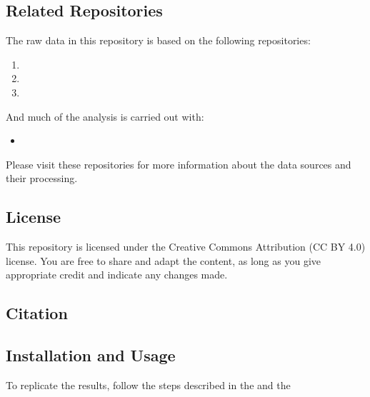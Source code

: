 \documentclass[letterpaper,10pt,english]{sphinxmanual}
\begin{document}
\subsection{Related Repositories}
\label{\detokenize{home:related-repositories}}
\sphinxAtStartPar
The raw data in this repository is based on the following repositories:
\begin{enumerate}
%
\item {} 
\sphinxAtStartPar
{}

\item {} 
\sphinxAtStartPar
{}

\item {} 
\sphinxAtStartPar
{}

\end{enumerate}

\sphinxAtStartPar
And much of the analysis is carried out with:
\begin{itemize}
\item {} 
\sphinxAtStartPar
{}

\end{itemize}

\sphinxAtStartPar
Please visit these repositories for more information about the data
sources and their processing.


\subsection{License}
\label{\detokenize{home:license}}
\sphinxAtStartPar
This repository is licensed under the Creative Commons Attribution (CC
BY 4.0) license. You are free to share and adapt the content, as long as
you give appropriate credit and indicate any changes made.


\subsection{Citation}
\label{\detokenize{home:citation}}


\subsection{Installation and Usage}
\label{\detokenize{home:installation-and-usage}}
\sphinxAtStartPar
To replicate the results, follow the steps described in the
and the 
\end{document}
